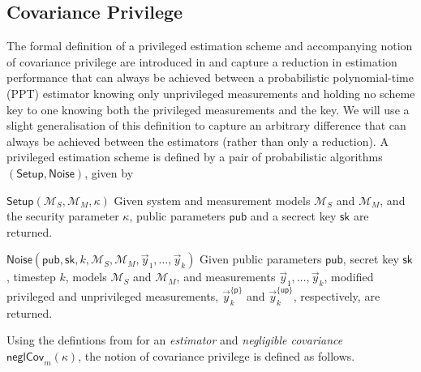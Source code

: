 \documentclass[letterpaper, 10 pt, conference]{ieeeconf}
\begin{document}
\subsection{Covariance Privilege}\label{subsec:crypto_privilege}
The formal definition of a privileged estimation scheme and accompanying notion of covariance privilege are introduced in \cite{risticCryptographicallyPrivilegedState2022} and capture a reduction in estimation performance that can always be achieved between a probabilistic polynomial-time (PPT) estimator knowing only unprivileged measurements and holding no scheme key to one knowing both the privileged measurements and the key. We will use a slight generalisation of this definition to capture an arbitrary difference that can always be achieved between the estimators (rather than only a reduction). A privileged estimation scheme is defined by a pair of probabilistic algorithms $(\mathsf{Setup}, \mathsf{Noise})$, given by
\begin{LaTeXdescription}
  \item[$\mathsf{Setup}(\mathcal{M}_S,\mathcal{M}_M,\kappa)$] Given system and measurement models $\mathcal{M}_S$ and $\mathcal{M}_M$, and the security parameter $\kappa$, public parameters $\mathsf{pub}$ and a secrect key $\mathsf{sk}$ are returned.
  \item[$\mathsf{Noise}(\mathsf{pub},\mathsf{sk},k,\mathcal{M}_S,\mathcal{M}_M,\vec{y}_1,\dots,\vec{y}_k)$] Given public parameters $\mathsf{pub}$, secret key $\mathsf{sk}$, timestep $k$, models $\mathcal{M}_S$ and $\mathcal{M}_M$, and measurements $\vec{y}_1,\dots,\vec{y}_k$, modified privileged and unprivileged measurements, $\vec{y}^{\{\mathsf{p}\}}_k$ and $\vec{y}^{\{\mathsf{up}\}}_k$, respectively, are returned.
\end{LaTeXdescription}
Using the defintions from \cite{risticCryptographicallyPrivilegedState2022} for an \textit{estimator} and \textit{negligible covariance} $\mathsf{neglCov}_m(\kappa)$, the notion of covariance privilege is defined as follows.
\end{document}
